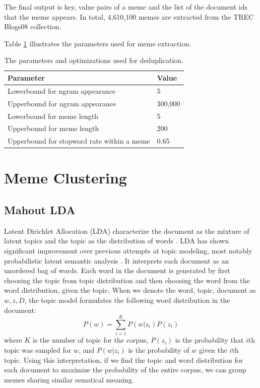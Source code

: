 \documentclass{sig-alternate}
\begin{document}
The final output is key, value pairs of a meme and the list of the document ids that the meme appears. In total, 4,610,100 memes are extracted from the TREC Blogs08 collection.

Table \ref{table:memeext} illustrates the parameters used for meme extraction.

\begin{table}[h!t!]
\begin{center}
\begin{tabular}{l|l}

\hline
\textbf{Parameter} & \textbf{Value}\\

\hline
Lowerbound for ngram appearance & 5\\
\hline
Upperbound for ngram appearance & 300,000\\
\hline
Lowerbound for meme length & 5\\
\hline
Upperbound for meme length & 200\\

\hline
Upperbound for stopword rate within a meme & 0.65\\

\hline
\end{tabular}
\caption{The parameters and optimizations used for deduplication.}
\label{table:memeext}
\end{center}
\end{table}

\section{Meme Clustering}

\subsection{Mahout LDA}
Latent Dirichlet Allocation (LDA)  characterize the document as the mixture of latent topics and the topic as the distribution of words \cite{Blei2003a}. LDA has shown significant improvement over previous attempts at topic modeling, most notably probabilistic latent semantic analysis \cite{Hofmann1999}.  It interprets each document as an unordered bag of words. Each word in the document is generated by first choosing the topic from topic distribution and then choosing the word from the word distribution, given the topic. When we denote the word, topic, document as $w, z, D$, the topic model formulates the following word distribution in the document:
\begin{displaymath}
 P(w)=\sum_{i=1}^K P(w|z_i)P(z_i)
\end{displaymath}
where $K$ is the number of topic for the corpus, $P(z_i)$ is the probability that $i$th topic was sampled for $w$, and $P(w|z_i)$ is the probability of $w$ given the $i$th topic. Using this interpretation, if we find the topic and word distribution for each document to maximize the probability of the entire corpus, we can group memes sharing similar sematical meaning.
\end{document}
